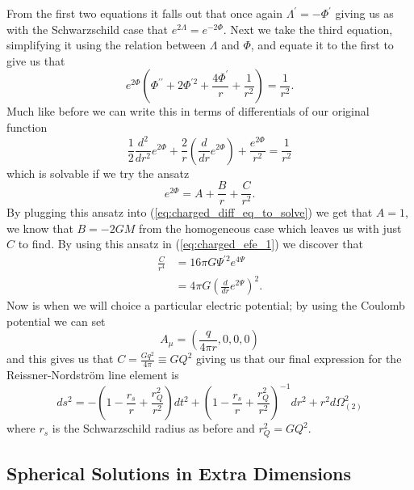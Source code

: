 \documentclass[12pt]{article}
\numberwithin{equation}{section}
\numberwithin{figure}{section}
\begin{document}
From the first two equations it falls out that once again $\Lambda ^{\prime} =-\Phi ^{\prime}$ giving us as with the Schwarzschild case that $e^{2\Lambda}=e^{-2\Phi}$. Next we take the third equation, simplifying it using the relation between $\Lambda$ and $\Phi$, and equate it to the first to give us that
\begin{equation}
	e^{2\Phi}\left(\Phi ^{\prime\prime} + 2\Phi ^{\prime 2} +\frac{4\Phi ^{\prime} }{r} +\frac{1}{r^{2}}\right)= \frac{1}{r^{2}}.
\end{equation}
Much like before we can write this in terms of differentials of our original function
\begin{equation}
	\frac{1}{2}\frac{d^{2}}{dr^{2}} e^{2\Phi} +\frac{2}{r}\left(\frac{d}{dr}e^{2\Phi}\right) + \frac{e^{2\Phi}}{r^{2}}=\frac{1}{r^{2}} \label{eq:charged_diff_eq_to_solve}
\end{equation}
which is solvable if we try the ansatz 
\begin{equation}
	e^{2\Phi}=A+\frac{B}{r}+\frac{C}{r^{2}}.
\end{equation}
By plugging this ansatz into (\ref{eq:charged_diff_eq_to_solve}) we get that $A=1$, we know that $B=-2GM$ from the homogeneous case which leaves us with just $C$ to find. By using this ansatz in (\ref{eq:charged_efe_1}) we discover that
\begin{align}
	\frac{C}{r^{4}}&=16\pi G \Psi ^{\prime 2} e^{4\Psi}\\
	&= 4\pi G \left(\frac{d}{dr}e^{2\Psi}\right)^{2}.
\end{align}
Now is when we will choice a particular electric potential; by using the Coulomb potential we can set 
\begin{equation}
	A_{\mu}=\left(\frac{q}{4\pi r},0,0,0\right)
\end{equation}
and this gives us that $C=\frac{Gq^{2}}{4\pi}\equiv GQ^{2}$ giving us that our final expression for the Reissner-Nordstr\"om line element is
\begin{equation}
	ds^2 = -\left(1- \frac{r_s}{r} +\frac{r_Q^2}{r^2}\right)dt^2 +\left(1- \frac{r_s}{r} +\frac{r_Q^2}{r^2}\right)^{-1}dr^2 + r^2d\Omega^2_{(2)}
\end{equation}
where $r_s$ is the Schwarzschild radius as before and $r_Q^2=GQ^{2}$.
\subsection{Spherical Solutions in Extra Dimensions} %
\label{sub:spherical_solution_in_extra_dimensions}
\end{document}
